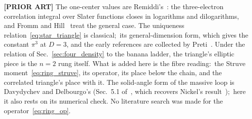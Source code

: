 \documentclass[aps,pra,twocolumn,superscriptaddress,longbibliography]{revtex4-2}
\begin{document}
\textbf{[PRIOR ART]} The one-center values are Remiddi's~\cite{remiddi1991}:
the three-electron correlation integral over Slater functions closes in
logarithms and dilogarithms, and Fromm and Hill~\cite{fromm_hill1987} treat
the general case.  The uniqueness relation~\eqref{eq:star_triangle} is
classical;\ its general-dimension form, which gives the constant $\pi^3$ at
$D=3$, and the early references are collected by Preti~\cite{preti2018}.
Under the relation of Sec.~\ref{sec:four_density} to the banana ladder, the
triangle's elliptic piece is the $n=2$ rung itself.  What is added here is the fibre reading:\ the Struve
moment~\eqref{eq:ring_struve}, its operator, its place below the chain,
and the correlated triangle's place with it.  The solid-angle form of the massive loop is Davydychev and Delbourgo's
(Sec.~5.1 of~\cite{davydychev_delbourgo1998}, which recovers Nickel's
result~\cite{nickel1978});\ here it also rests on its numerical check.
No literature search was made for the operator~\eqref{eq:ring_op}.
\end{document}
